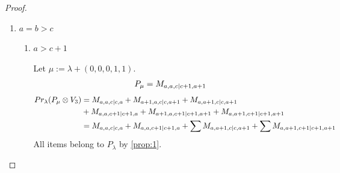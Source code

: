 \begin{proof}
\begin{enumerate}
\begin{enumerate}
    \end{enumerate}
  \item $a=b>c$ 
    \begin{enumerate}
      \item $a>c+1$ \par
        Let $\mu:=\lambda + (0,0,0,1,1) $.
        \begin{equation}\notag
          \begin{aligned}
            P_\mu = M_{a,a,c|c+1,a+1}
          \end{aligned}
        \end{equation}
        \begin{equation}\notag
          \begin{aligned}
            Pr_{\lambda}(P_\mu \otimes V_{3}) &=
M_{a,a,c|c,a}
+ M_{a+1,a,c|c,a+1}
+ M_{a,a+1,c|c,a+1}\\
                                              &
+ M_{a,a,c+1|c+1,a}
+ M_{a+1,a,c+1|c+1,a+1}
+ M_{a,a+1,c+1|c+1,a+1} \\
                                               &=
 M_{a,a,c|c,a}
+  M_{a,a,c+1|c+1,a}
+ \sum M_{a,a+1,c|c,a+1}
+ \sum M_{a,a+1,c+1|c+1,a+1}
          \end{aligned}
        \end{equation}
All items belong to $P_\lambda$ by \cref{prop:1}.


\end{enumerate}
\end{enumerate}
\end{proof}
